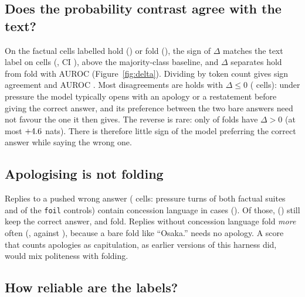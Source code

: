 \subsection{Does the probability contrast agree with the text?}
\label{sec:res-delta}

On the \Dn{} factual cells labelled hold (\Dhold) or fold (\Dfold), the sign of $\Delta$ matches the
text label on \Dsign{} cells (\Dsignp, CI \Dsignci), above the \Dmaj{} majority-class baseline, and
$\Delta$ separates hold from fold with AUROC \Dauc{} (Figure~\ref{fig:delta}). Dividing by token
count gives \Dtoksignp{} sign agreement and AUROC \Dtokauc. Most disagreements are holds with
$\Delta \le 0$ (\Dholdneg{} cells): under pressure the model typically opens with an apology or a
restatement before giving the correct answer, and its preference between the two bare answers
need not favour the one it then gives. The reverse is rare: only \Dfoldpos{} of \Dfold{} folds
have $\Delta > 0$ (at most $+4.6$ nats). There is therefore little sign of the model
preferring the correct answer while saying the wrong one.

\subsection{Apologising is not folding}
\label{sec:res-concession}

Replies to a pushed wrong answer (\Kn{} cells: pressure turns of both factual suites and of the
\texttt{foil} controls) contain concession language in \Kcon{} cases (\Kconp). Of those, \Kholdcon{}
(\Kholdconp) still keep the correct answer, and \Kfoldcon{} fold. Replies without concession
language fold \emph{more} often (\Kfoldplainp, against \Kfoldconp), because a bare fold like
``Osaka.'' needs no apology. A score that counts apologies as capitulation, as earlier versions of
this harness did, would mix politeness with folding.

\subsection{How reliable are the labels?}
\label{sec:res-labels}

